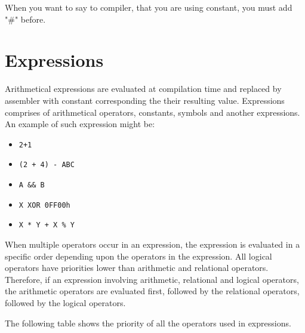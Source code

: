     When you want to say to compiler, that you are using constant, you must add "\#" before.

\clearpage
\section{Expressions}
    Arithmetical expressions are evaluated at compilation time and replaced by assembler with constant corresponding the their resulting value. Expressions comprises of arithmetical operators, constants, symbols and another expressions. An example of such expression might be:

    \begin{itemize}
        \item \texttt{2+1}
        \item \texttt{(2 + 4) - ABC}
        \item \texttt{A \&\& B}
        \item \texttt{X XOR 0FF00h}
        \item \texttt{X * Y + X \% Y}
    \end{itemize}

    When multiple operators occur in an expression, the expression is evaluated in a specific order depending upon the operators in the expression. All logical operators have priorities lower than arithmetic and relational operators. Therefore, if an expression involving arithmetic, relational and logical operators, the arithmetic operators are evaluated first, followed by the relational operators, followed by the logical operators.

    The following table shows the priority of all the operators used in expressions.

